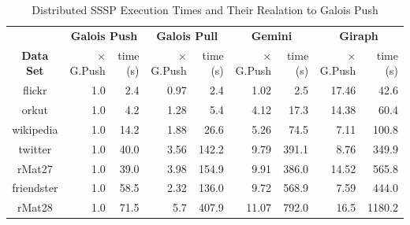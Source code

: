 \begin{table}
\renewcommand{\arraystretch}{1.2}
\renewcommand{\rot}[1]{\rotatebox{90}{#1}}
\centering
\caption{Distributed SSSP Execution Times and Their Realation to Galois Push}
\begin{tabular}{c@{\tabskip 1.4 \tabcolsep}r@{\tabskip 1 \tabcolsep}r@{\tabskip 1.4 \tabcolsep}r@{\tabskip 1 \tabcolsep}r@{\tabskip 1.4 \tabcolsep}r@{\tabskip 1 \tabcolsep}r@{\tabskip 1.4 \tabcolsep}r@{\tabskip 1 \tabcolsep}r}
\toprule
&
\multicolumn{2}{c}{\bf Galois Push}&\multicolumn{2}{c}{\bf Galois Pull}&\multicolumn{2}{c}{\bf Gemini}&\multicolumn{2}{c}{\bf Giraph}\\
\cmidrule{2-3}\cmidrule{4-5}\cmidrule{6-7}\cmidrule{8-9}
\bf{Data Set}&$\times$G.Push&time (s)&$\times$G.Push&time (s)&$\times$G.Push&time (s)&$\times$G.Push&time (s)\\\midrule
flickr & 1.0 & 2.4 & 0.97 & 2.4 & 1.02 & 2.5 & 17.46 & 42.6\\
orkut & 1.0 & 4.2 & 1.28 & 5.4 & 4.12 & 17.3 & 14.38 & 60.4\\
wikipedia & 1.0 & 14.2 & 1.88 & 26.6 & 5.26 & 74.5 & 7.11 & 100.8 \\
twitter & 1.0 & 40.0 & 3.56 & 142.2 & 9.79 & 391.1 & 8.76 & 349.9\\
rMat27 & 1.0 & 39.0 & 3.98 & 154.9 & 9.91 & 386.0 & 14.52 & 565.8\\
friendster & 1.0 & 58.5 & 2.32 & 136.0 & 9.72 & 568.9 & 7.59 & 444.0\\
rMat28 & 1.0 & 71.5 & 5.7 & 407.9 & 11.07 & 792.0 & 16.5 & 1180.2\\\bottomrule
\end{tabular}
\label{tbl:ssspexec}
\end{table}

